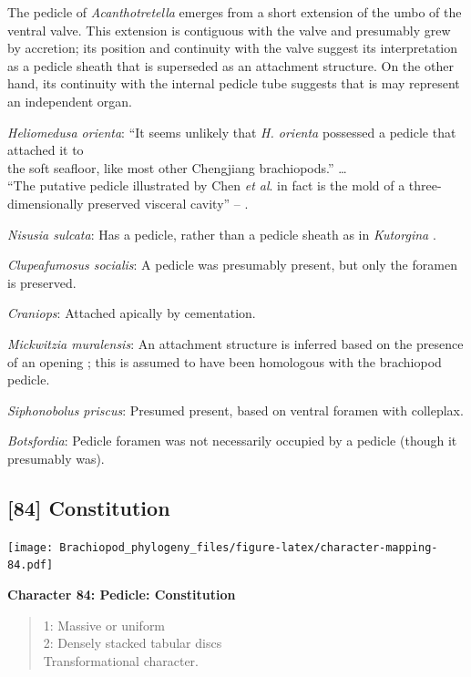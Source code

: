 \documentclass[openany]{book}
\theoremstyle{definition}
\theoremstyle{definition}
\theoremstyle{definition}
\theoremstyle{remark}
\begin{document}
The pedicle of \emph{Acanthotretella} emerges from a short extension of
the umbo of the ventral valve. This extension is contiguous with the
valve and presumably grew by accretion; its position and continuity with
the valve suggest its interpretation as a pedicle sheath that is
superseded as an attachment structure. On the other hand, its continuity
with the internal pedicle tube suggests that is may represent an
independent organ.

\emph{Heliomedusa orienta}: ``It seems unlikely that \emph{H. orienta}
possessed a pedicle that attached it to\\
the soft seafloor, like most other Chengjiang brachiopods.'' \ldots{}\\
``The putative pedicle illustrated by Chen \emph{et al}.
\citeyearpar[Figs 4, 6, 7]{Chen2007Reinterpretationof} in fact is the
mold of a three-dimensionally preserved visceral cavity'' --
\citet{Zhang2009Architectureand}.

\emph{Nisusia sulcata}: Has a pedicle, rather than a pedicle sheath as
in \emph{Kutorgina}
\citep{Holmer2018Evolutionarysignificance, Holmer2018Theattachment}.

\emph{Clupeafumosus socialis}: A pedicle was presumably present, but
only the foramen is preserved.

\emph{Craniops}: Attached apically by cementation.

\emph{Mickwitzia muralensis}: An attachment structure is inferred based
on the presence of an opening \citep{Balthasar2004Shellstructure}; this
is assumed to have been homologous with the brachiopod pedicle.

\emph{Siphonobolus priscus}: Presumed present, based on ventral foramen
with colleplax.

\emph{Botsfordia}: Pedicle foramen was not necessarily occupied by a
pedicle (though it presumably was).

\hypertarget{constitution}{%
\subsection*{{[}84{]} Constitution}\label{constitution}}

\texttt{[image: Brachiopod\_phylogeny\_files/figure-latex/character-mapping-84.pdf]}

\textbf{Character 84: Pedicle: Constitution}

\begin{quote}
1: Massive or uniform\\
2: Densely stacked tabular discs\\
Transformational character.
\end{quote}
\end{document}

